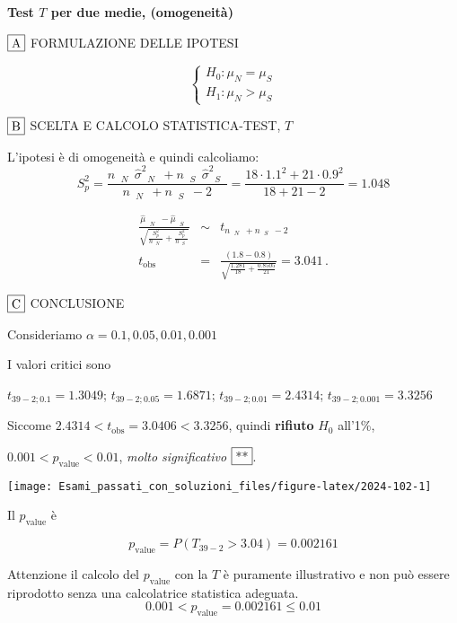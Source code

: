 \documentclass[
  11pt,
]{book}
\theoremstyle{mytheoremstyle}
\theoremstyle{mydefstyle}
\newenvironment{sol}
  {
  \begin{tcolorbox}[enhanced,breakable,arc=0.1mm,boxrule=1pt,colback=white,colframe=iblue,
  title=\bf \fontfamily{lmss}\selectfont \hspace{.5 cm} Soluzione,drop fuzzy shadow]

}{
\end{tcolorbox}
  }
\begin{document}
\begin{sol}
\textbf{Test \(T\) per due medie, (omogeneità)}

\(\fbox{A}\) FORMULAZIONE DELLE IPOTESI

\[\begin{cases}
   H_0: \mu_\text{$N$} = \mu_\text{$S$} \\
   H_1: \mu_\text{$N$} > \mu_\text{$S$} 
   \end{cases}\]

\(\fbox{B}\) SCELTA E CALCOLO STATISTICA-TEST, \(T\)

L'ipotesi è di omogeneità e quindi calcoliamo:\[
   S_p^2=\frac{n_\text{ $N$ }\hat\sigma^2_\text{ $N$ }+n_\text{ $S$ }\hat\sigma^2_\text{ $S$ }}{n_\text{ $N$ }+n_\text{ $S$ }-2} =
   \frac{ 18 \cdot 1.1 ^2+ 21 \cdot 0.9 ^2}{ 18 + 21 -2}= 1.048 
  \]

\begin{eqnarray*}
  \frac{\hat\mu_\text{ $N$ } - \hat\mu_\text{ $S$ }}
  {\sqrt{\frac {S^2_p}{n_\text{ $N$ }}+\frac {S^2_p}{n_\text{ $S$ }}}}&\sim&t_{n_\text{ $N$ }+n_\text{ $S$ }-2}\\
  t_{\text{obs}}
  &=& \frac{ ( 1.8 -  0.8 )} {\sqrt{\frac{ 1.281 }{ 18 }+\frac{ 0.8505 }{ 21 }}}
  =   3.041 \, .
  \end{eqnarray*}

\(\fbox{C}\) CONCLUSIONE

Consideriamo \(\alpha=0.1, 0.05, 0.01, 0.001\)

I valori critici sono

\(t_{39-2;0.1}=1.3049\); \(t_{39-2;0.05}=1.6871\); \(t_{39-2;0.01}=2.4314\); \(t_{39-2;0.001}=3.3256\)

Siccome \(2.4314<t_\text{obs}=3.0406<3.3256\), quindi \textbf{rifiuto} \(H_0\) all'1\%,

\(0.001<p_\text{value}<0.01\), \emph{molto significativo} \(\fbox{**}\).

\begin{center}\texttt{[image: Esami\_passati\_con\_soluzioni\_files/figure-latex/2024-102-1]} \end{center}

Il \(p_{\text{value}}\) è

\[ p_{\text{value}} = P(T_{39-2}>3.04)=0.002161 \]

Attenzione il calcolo del \(p_\text{value}\) con la \(T\) è puramente illustrativo e non può essere riprodotto senza una calcolatrice statistica adeguata.\[
 0.001 < p_\text{value}= 0.002161 \leq 0.01 
\]

\end{sol}
\end{document}
